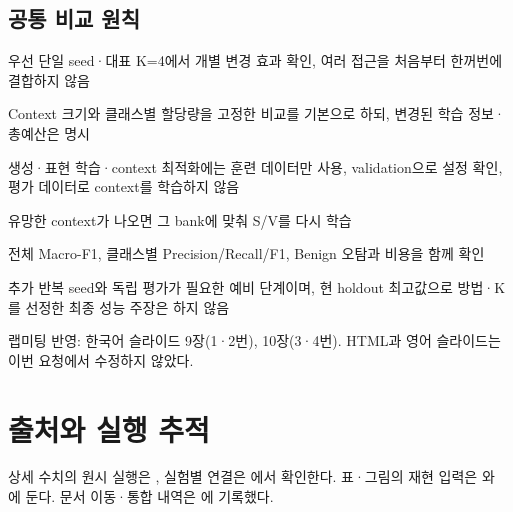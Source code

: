 \subsection{공통 비교 원칙}
\par\noindent \textbullet\enspace 우선 단일 seed·대표 K=\allowbreak{}4에서 개별 변경 효과 확인, 여러 접근을 처음부터 한꺼번에 결합하지 않음


\par\noindent \textbullet\enspace Context 크기와 클래스별 할당량을 고정한 비교를 기본으로 하되, 변경된 학습 정보·총예산은 명시


\par\noindent \textbullet\enspace 생성·표현 학습·context 최적화에는 훈련 데이터만 사용, validation으로 설정 확인, 평가 데이터로 context를 학습하지 않음


\par\noindent \textbullet\enspace 유망한 context가 나오면 그 bank에 맞춰 S/\allowbreak{}V를 다시 학습


\par\noindent \textbullet\enspace 전체 Macro-F1, 클래스별 Precision/\allowbreak{}Recall/\allowbreak{}F1, Benign 오탐과 비용을 함께 확인


\par\noindent \textbullet\enspace 추가 반복 seed와 독립 평가가 필요한 예비 단계이며, 현 holdout 최고값으로 방법·K를 선정한 최종 성능 주장은 하지 않음


랩미팅 반영: 한국어 슬라이드 9장(1·2번), 10장(3·4번). HTML과 영어 슬라이드는 이번 요청에서 수정하지 않았다.



\section*{출처와 실행 추적}

상세 수치의 원시 실행은 , 실험별 연결은 에서 확인한다. 표·그림의 재현 입력은 와 에 둔다. 문서 이동·통합 내역은 에 기록했다.


